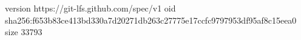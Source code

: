 version https://git-lfs.github.com/spec/v1
oid sha256:f653b83ce413bd330a7d20271db263c27775e17ccfc9797953df95af8c15eea0
size 33793
